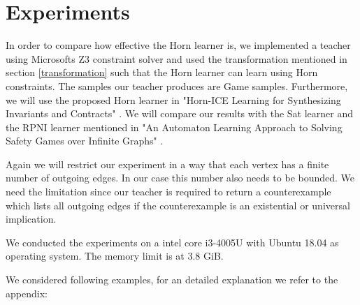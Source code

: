 \documentclass[10pt,a4paper]{article}
\theoremstyle{plain}
\theoremstyle{definition}
\begin{document}
\section{Experiments}
In order to compare how effective the Horn learner is, we implemented a teacher using Microsofts Z3 \cite{de2008z3} constraint solver and used the transformation mentioned in section \ref{transformation} such that the Horn learner can learn using Horn constraints. The samples our teacher produces are Game samples. Furthermore, we will use the proposed Horn learner in "Horn-ICE Learning for Synthesizing Invariants and Contracts" \cite{d2017horn}. We will compare our results with the Sat learner and the RPNI learner mentioned in "An Automaton Learning Approach to Solving Safety Games over Infinite Graphs" \cite{neider2016automaton}. 

Again we will restrict our experiment in a way that each vertex has a finite number of outgoing edges. In our case this number also needs to be bounded. We need the limitation since our teacher is required to return a counterexample which lists all outgoing edges if the counterexample is an existential or universal implication.

We conducted the experiments on a intel core i3-4005U with Ubuntu 18.04 as operating system. The memory limit is at 3.8 GiB.

We considered following examples, for an detailed explanation we refer to the appendix:
\end{document}
